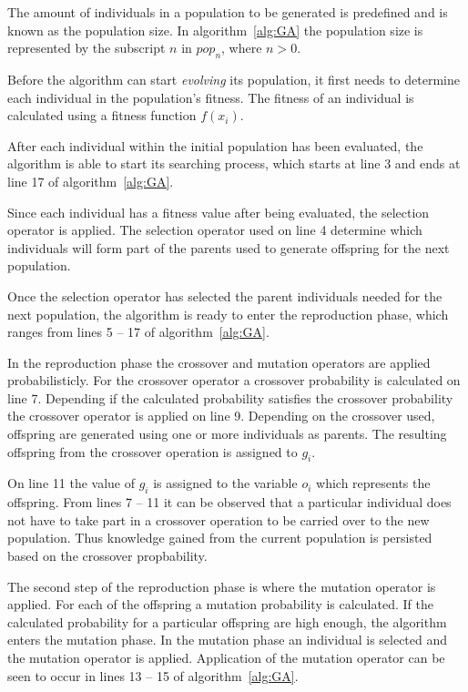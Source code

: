 The amount of individuals in a population to be generated is predefined and is known as the population size. In algorithm~\ref{alg:GA} the population size is represented by the subscript $n$ in $pop_n$, where $n > 0$.

Before the algorithm can start \emph{evolving} its population, it first needs to determine each individual in the population's fitness. The fitness of an individual is calculated using a fitness function $f(x_i)$.

After each individual within the initial population has been evaluated, the algorithm is able to start its searching process, which starts at line 3 and ends at line 17 of algorithm~\ref{alg:GA}.

Since each individual has a fitness value after being evaluated, the selection operator is applied. The selection operator used on line 4 determine which individuals will form part of the parents used to generate offspring for the next population.

Once the selection operator has selected the parent individuals needed for the next population, the algorithm is ready to enter the reproduction phase, which ranges from lines 5 -- 17 of algorithm~\ref{alg:GA}.

In the reproduction phase the crossover and mutation operators are applied probabilisticly. For the crossover operator a crossover probability is calculated on line 7. Depending if the calculated probability satisfies the crossover probability the crossover operator is applied on line 9. Depending on the crossover used, offspring are generated using one or more individuals as parents. The resulting offspring from the crossover operation is assigned to $g_i$.

On line 11 the value of $g_i$ is assigned to the variable $o_i$ which represents the offspring. From lines 7 -- 11 it can be observed that a particular individual does not have to take part in a crossover operation to be carried over to the new population. Thus knowledge gained from the current population is persisted based on the crossover propbability.

The second step of the reproduction phase is where the mutation operator is applied. For each of the offspring a mutation probability is calculated. If the calculated probability for a particular offspring are high enough, the algorithm enters the mutation phase. In the mutation phase an individual is selected and the mutation operator is applied. Application of the mutation operator can be seen to occur in lines 13 -- 15 of algorithm~\ref{alg:GA}.

